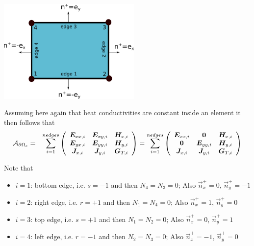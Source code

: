 \begin{center}
\includegraphics[width=7cm]{images/dgfem/dgelts_q1}
\end{center}

Assuming here again that heat conductivities are constant inside an element
it then follows that 
\begin{eqnarray}
 {\cal A}_{\partial\Omega_e}
&=&
\sum_{i=1}^{nedges}
\left(
\begin{array}{ccc}
{\bm E}_{xx,i} & {\bm E}_{xy,i} & {\bm H}_{x,i} \\
{\bm E}_{yx,i} & {\bm E}_{yy,i} & {\bm H}_{y,i} \\
{\bm J}_{x,i} & {\bm J}_{y,i} & {\bm G}_{T,i}
\end{array}
\right)
=
\sum_{i=1}^{nedges}
\left(
\begin{array}{ccc}
{\bm E}_{xx,i} & {\bm 0} & {\bm H}_{x,i} \\
{\bm 0} & {\bm E}_{yy,i} & {\bm H}_{y,i} \\
{\bm J}_{x,i} & {\bm J}_{y,i} & {\bm G}_{T,i}
\end{array}
\right)
\end{eqnarray}



Note that 
\begin{itemize}
\item $i=1$: bottom edge, i.e. $s=-1$ and then $N_4=N_3=0$; Also $\vec{n}_x^+=0$, $\vec{n}_y^+=-1$
\item $i=2$: right  edge, i.e.  $r=+1$ and then $N_1=N_4=0$; Also $\vec{n}_x^+=1$, $\vec{n}_y^+=0$
\item $i=3$: top edge, i.e. $s=+1$  and then $N_1=N_2=0$; Also $\vec{n}_x^+=0$, $\vec{n}_y^+=1$
\item $i=4$: left edge, i.e. $r=-1$ and then $N_2=N_3=0$; Also $\vec{n}_x^+=-1$, $\vec{n}_y^+=0$
\end{itemize}

